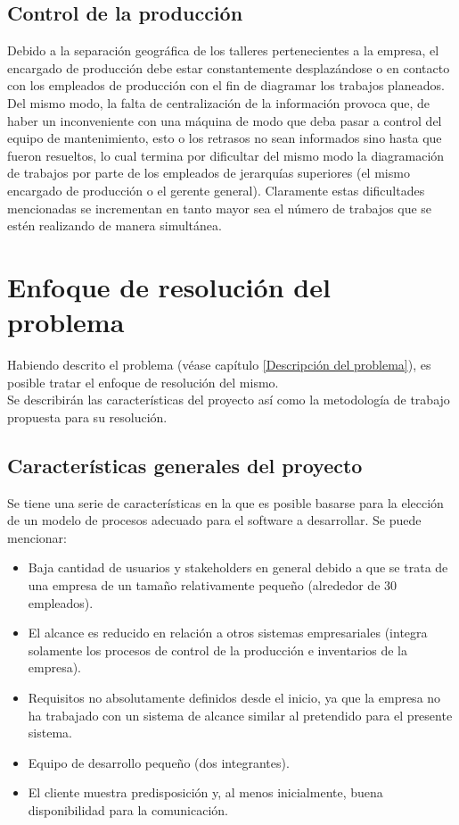 \documentclass[a4paper, 12pt,twoside]{report}  %
\numberwithin{equation}{subsection} %
\begin{document}
\section{Control de la producción}

Debido a la separación geográfica de los talleres pertenecientes a la empresa, el encargado de producción debe estar constantemente desplazándose o en contacto con los empleados de producción con el fin de diagramar los trabajos planeados. Del mismo modo, la falta de centralización de la información provoca que, de haber un inconveniente con una máquina de modo que deba pasar a control del equipo de mantenimiento, esto o los retrasos no sean informados sino hasta que fueron resueltos, lo cual termina por dificultar del mismo modo la diagramación de trabajos por parte de los empleados de jerarquías superiores (el mismo encargado de producción o el gerente general). Claramente estas dificultades mencionadas se incrementan en tanto mayor sea el número de trabajos que se estén realizando de manera simultánea.

\chapter{Enfoque de resolución del problema}

Habiendo descrito el problema (véase capítulo \ref{Descripción del problema}), es posible tratar el enfoque de resolución del mismo.\\
\indent Se describirán las características del proyecto así como la metodología de trabajo propuesta para su resolución.

\section{Características generales del proyecto}
\label{Caracteristicas_generales_del_proyecto}
Se tiene una serie de características en la que es posible basarse para la elección de un modelo de procesos adecuado para el software a desarrollar. Se puede mencionar:
\begin{itemize}
	\item Baja cantidad de usuarios y stakeholders en general debido a que se trata de una empresa de un tamaño relativamente pequeño (alrededor de 30 empleados).
	\item El alcance es reducido en relación a otros sistemas empresariales (integra solamente los procesos de control de la producción e inventarios de la empresa).
	\item Requisitos no absolutamente definidos desde el inicio, ya que la empresa no ha trabajado con un sistema de alcance similar al pretendido para el presente sistema.
	\item Equipo de desarrollo pequeño (dos integrantes).
	\item El cliente muestra predisposición y, al menos inicialmente, buena disponibilidad para la comunicación.
\end{itemize}
\end{document}
